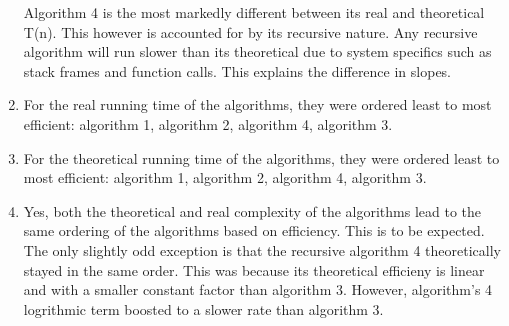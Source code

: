 \documentclass{article}
\begin{document}
\begin{enumerate}
  Algorithm 4 is the most markedly different between its real and
  theoretical T(n). This however is accounted for by its recursive
  nature. Any recursive algorithm will run slower than its theoretical
  due to system specifics such as stack frames and function
  calls. This explains the difference in slopes.
\item
  For the real running time of the algorithms, they were ordered least to
  most efficient: algorithm 1, algorithm 2, algorithm 4, algorithm 3.
\item
  For the theoretical running time of the algorithms, they were
  ordered least to most efficient: algorithm 1, algorithm 2, algorithm
  4, algorithm 3.
\item
  Yes, both the theoretical and real complexity of the algorithms lead
  to the same ordering of the algorithms based on efficiency. This is
  to be expected. The only slightly odd exception is that the
  recursive algorithm 4 theoretically stayed in the same order. This
  was because its theoretical efficieny is linear and with a smaller
  constant factor than algorithm 3. However, algorithm's 4 logrithmic
  term boosted to a slower rate than algorithm 3.
\end{enumerate}
\end{document}
